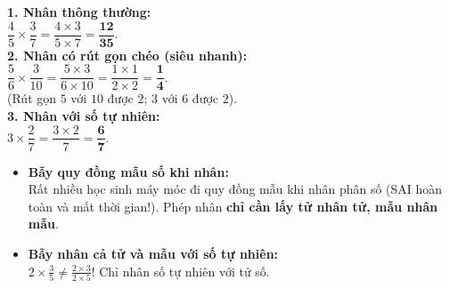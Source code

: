 \documentclass[14pt,a4paper,oneside]{extbook}
\begin{document}
\vspace{-2.5mm}
\noindent
\begin{minipage}[t]{0.49\textwidth}\vspace{0pt}
\begin{tcolorbox}[
  enhanced,
  colback=green!4!white,
  colframe=green!60!black,
  arc=2mm, boxrule=0.8pt,
  left=2mm, right=2mm, top=1.8mm, bottom=1.8mm,
  title={\footnotesize\bfseries\color{white}\faCheckCircle\ Ví dụ thực hành chuẩn mực}
]
{\footnotesize
\textbf{1. Nhân thông thường:}\\
$\dfrac{4}{5} \times \dfrac{3}{7} = \dfrac{4 \times 3}{5 \times 7} = \mathbf{\dfrac{12}{35}}$.\\
\textbf{2. Nhân có rút gọn chéo (siêu nhanh):}\\
$\dfrac{5}{6} \times \dfrac{3}{10} = \dfrac{5 \times 3}{6 \times 10} = \dfrac{1 \times 1}{2 \times 2} = \mathbf{\dfrac{1}{4}}$.\\
(Rút gọn $5$ với $10$ được $2$; $3$ với $6$ được $2$).\\
\textbf{3. Nhân với số tự nhiên:}\\
$3 \times \dfrac{2}{7} = \dfrac{3 \times 2}{7} = \mathbf{\dfrac{6}{7}}$.
}
\end{tcolorbox}
\end{minipage}
\hfill
\begin{minipage}[t]{0.49\textwidth}\vspace{0pt}
\begin{tcolorbox}[
  enhanced,
  colback=red!4!white,
  colframe=red!70!black,
  arc=2mm, boxrule=0.8pt,
  left=2mm, right=2mm, top=1.8mm, bottom=1.8mm,
  title={\footnotesize\bfseries\color{white}\faExclamationTriangle\ Mẹo tránh bẫy trắc nghiệm}
]
{\footnotesize
\begin{itemize}\setlength{\itemsep}{1.5pt}\setlength{\leftskip}{-2.5mm}
  \item \textbf{Bẫy quy đồng mẫu số khi nhân:}\\
  Rất nhiều học sinh máy móc đi quy đồng mẫu khi nhân phân số (SAI hoàn toàn và mất thời gian!). Phép nhân \textbf{chỉ cần lấy tử nhân tử, mẫu nhân mẫu}.
  \item \textbf{Bẫy nhân cả tử và mẫu với số tự nhiên:}\\
  $2 \times \frac{3}{5} \ne \frac{2 \times 3}{2 \times 5}$! Chỉ nhân số tự nhiên với tử số.
\end{itemize}
}
\end{tcolorbox}
\end{minipage}
\end{document}
